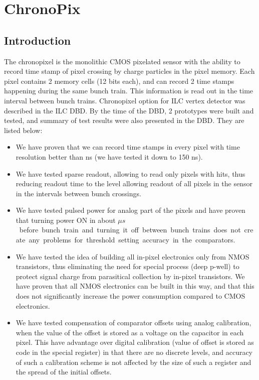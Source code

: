 \section{ChronoPix}

\subsection{Introduction}
The chronopixel is the monolithic CMOS pixelated sensor with the ability to record time stamp of pixel crossing by charge particles in the pixel memory. Each pixel contains 2 memory cells (12 bits each), and can record 2 time stamps happening during the same bunch train. This information is read out in the time interval between bunch trains. Chronopixel option for ILC vertex detector was described in the ILC DBD. By the time of the DBD, 2 prototypes were built and tested, and summary of test results were also presented in the DBD. They are listed below: 
\begin{itemize}
    \item We have proven that we can record time stamps in every pixel with time resolution better than \unit[300]{ns} (we have tested it down to 150 ns).
    \item We have tested sparse readout, allowing to read only pixels with hits, thus reducing readout time to the level allowing readout of all pixels in the sensor in the intervals between bunch crossings.
    \item We have tested pulsed power for analog part of the pixels and have proven that turning power ON in about \unit[100]{$\mu s$} before bunch train and turning it off between bunch trains does not create any problems for threshold setting accuracy in the comparators.
    \item We have tested the idea of building all in-pixel electronics only from NMOS transistors, thus eliminating the need for special process (deep p-well) to protect signal charge from parasitical collection by in-pixel transistors. We have proven that all NMOS electronics can be built in this way, and that this does not significantly increase the power consumption compared to CMOS electronics.
    \item We have tested compensation of comparator offsets using analog calibration, when the value of the offset is stored as a voltage on the capacitor in each pixel. This have advantage over digital calibration (value of offset is stored as code in the special register) in that there are no discrete levels, and accuracy of such a calibration scheme is not affected by the size of such a register and the spread of the initial offsets.
\end{itemize}
